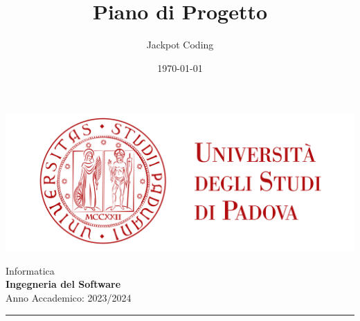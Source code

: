 \documentclass[5pt]{article}
\title{Piano di Progetto}
\author{Jackpot Coding}
\date{\today}
\begin{document}


  \vspace{8pt}
  \includegraphics[scale=0.2]{UNIPDFull.png}

\vspace{30pt}

\begin{minipage}[t]{0.48\textwidth}
        \begin{flushleft}
            Informatica\\
            \vspace{5pt}
            \textbf{\LARGE Ingegneria del Software}\\
            Anno Accademico: 2023/2024
        \end{flushleft}
\end{minipage}


\vspace{5px}


\rule{\textwidth}{5pt}
\end{document}
